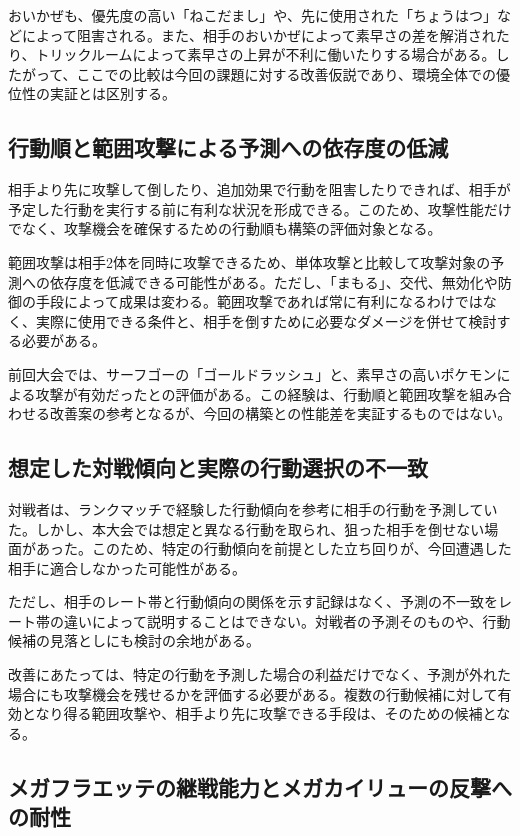 \documentclass[a4paper,10pt]{ltjsarticle}
\begin{document}
おいかぜも、優先度の高い「ねこだまし」や、先に使用された「ちょうはつ」などによって阻害される。また、相手のおいかぜによって素早さの差を解消されたり、トリックルームによって素早さの上昇が不利に働いたりする場合がある。したがって、ここでの比較は今回の課題に対する改善仮説であり、環境全体での優位性の実証とは区別する。

\subsection{行動順と範囲攻撃による予測への依存度の低減}

相手より先に攻撃して倒したり、追加効果で行動を阻害したりできれば、相手が予定した行動を実行する前に有利な状況を形成できる。このため、攻撃性能だけでなく、攻撃機会を確保するための行動順も構築の評価対象となる。

範囲攻撃は相手2体を同時に攻撃できるため、単体攻撃と比較して攻撃対象の予測への依存度を低減できる可能性がある。ただし、「まもる」、交代、無効化や防御の手段によって成果は変わる。範囲攻撃であれば常に有利になるわけではなく、実際に使用できる条件と、相手を倒すために必要なダメージを併せて検討する必要がある。

前回大会では、サーフゴーの「ゴールドラッシュ」と、素早さの高いポケモンによる攻撃が有効だったとの評価がある。この経験は、行動順と範囲攻撃を組み合わせる改善案の参考となるが、今回の構築との性能差を実証するものではない。

\subsection{想定した対戦傾向と実際の行動選択の不一致}

対戦者は、ランクマッチで経験した行動傾向を参考に相手の行動を予測していた。しかし、本大会では想定と異なる行動を取られ、狙った相手を倒せない場面があった。このため、特定の行動傾向を前提とした立ち回りが、今回遭遇した相手に適合しなかった可能性がある。

ただし、相手のレート帯と行動傾向の関係を示す記録はなく、予測の不一致をレート帯の違いによって説明することはできない。対戦者の予測そのものや、行動候補の見落としにも検討の余地がある。

改善にあたっては、特定の行動を予測した場合の利益だけでなく、予測が外れた場合にも攻撃機会を残せるかを評価する必要がある。複数の行動候補に対して有効となり得る範囲攻撃や、相手より先に攻撃できる手段は、そのための候補となる。

\subsection{メガフラエッテの継戦能力とメガカイリューの反撃への耐性}
\label{sec:mega-comparison}
\end{document}
